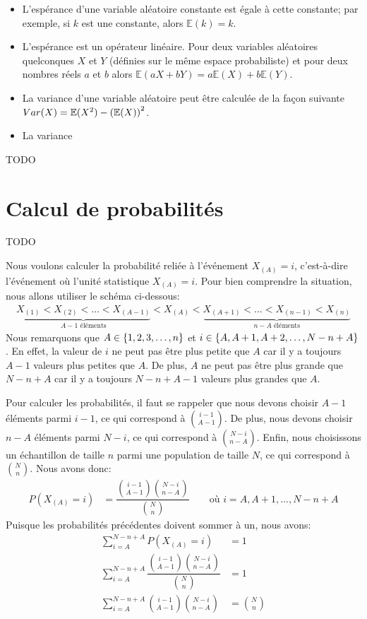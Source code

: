 \documentclass[10pt]{article}
\begin{document}
\begin{itemize}
\item
  L'espérance d'une variable aléatoire constante est égale à cette
  constante; par exemple, si \(k\) est une constante, alors
  \(\mathbb{E}(k)=k\).
\item
  L'espérance est un opérateur linéaire. Pour deux variables aléatoires
  quelconques \(X\) et \(Y\) (définies sur le même espace probabiliste)
  et pour deux nombres réels \(a\) et \(b\) alors
  \(\mathbb{E}(aX+bY)=a\mathbb{E}(X)+b\mathbb{E}(Y)\).
\item
  La variance d'une variable aléatoire peut être calculée de la façon
  suivante \(Var(X)=\mathbb{E}(X^2)-\left(\mathbb{E}(X)\right)^2\).
\item
  La variance
\end{itemize}

TODO

\hypertarget{calcul-de-probabilites}{%
\section{\texorpdfstring{Calcul de probabilités
\label{calculs_proba}}{Calcul de probabilités }}\label{calcul-de-probabilites}}

TODO

Nous voulons calculer la probabilité reliée à l'événement \(X_{(A)}=i\),
c'est-à-dire l'événement où l'unité statistique \(X_{(A)}=i\). Pour bien
comprendre la situation, nous allons utiliser le schéma ci-dessous:
\begin{align*}
\underbrace{X_{(1)} <  X_{(2)} < \ldots < X_{(A-1)}}_{A-1 \text{ éléments}} 
< X_{(A)} 
< \underbrace{X_{(A+1)} < \ldots < X_{(n-1)} < X_{(n)}}_{n-A \text{ éléments}}
\end{align*} Nous remarquons que \(A\in\left\{1,2,3,\ldots, n\right\}\) et
\(i\in\left\{A,A+1,A+2,\ldots,N-n+A\right\}\). En effet, la valeur de \(i\) ne
peut pas être plus petite que \(A\) car il y a toujours \(A-1\) valeurs
plus petites que \(A\). De plus, \(A\) ne peut pas être plus grande que
\(N-n+A\) car il y a toujours \(N-n+A-1\) valeurs plus grandes que
\(A\).

Pour calculer les probabilités, il faut se rappeler que nous devons
choisir \(A-1\) éléments parmi \(i-1\), ce qui correspond à
\(\binom{i-1}{A-1}\). De plus, nous devons choisir \(n-A\) éléments
parmi \(N-i\), ce qui correspond à \(\binom{N-i}{n-A}\). Enfin, nous
choisissons un échantillon de taille \(n\) parmi une population de
taille \(N\), ce qui correspond à \(\binom{N}{n}\). Nous avons donc:
\begin{align*}
P(X_{(A)}=i) &= \dfrac{\binom{i-1}{A-1}\binom{N-i}{n-A}}{\binom{N}{n}} \qquad \text{où } i=A,A+1,\ldots,N-n+A
\end{align*} Puisque les probabilités précédentes doivent sommer à un,
nous avons: \begin{align}
\sum_{i=A}^{N-n+A} P(X_{(A)}=i) &= 1 \nonumber\\
\sum_{i=A}^{N-n+A} \dfrac{\binom{i-1}{A-1}\binom{N-i}{n-A}}{\binom{N}{n}} &= 1 \nonumber\\
\sum_{i=A}^{N-n+A} \binom{i-1}{A-1}\binom{N-i}{n-A} &= \binom{N}{n} \label{eq:sumxA}
\end{align}
\end{document}
